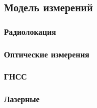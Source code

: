 \subsection{Модель измерений}

\subsubsection{Радиолокация}

\subsubsection{Оптические измерения}

\subsubsection{ГНСС}

\subsubsection{Лазерные}